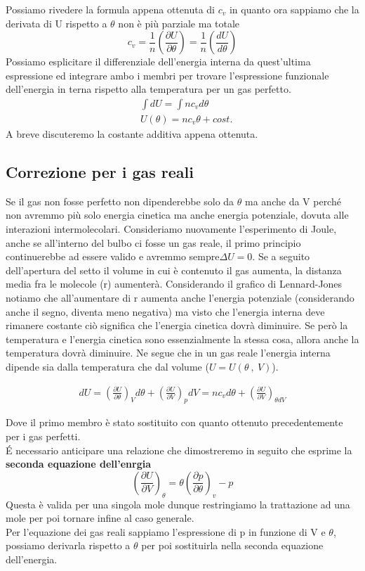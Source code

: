 \documentclass[10pt,a4paper]{article}
\begin{document}
Possiamo rivedere la formula appena ottenuta di \(c_v\) in quanto ora sappiamo che la derivata di U rispetto a $\theta$ non è più parziale ma totale
\[c_v =\frac{1}{n}\left(\frac{\partial U}{\partial\theta}\right)=\frac{1}{n}\left(\frac{dU}{d\theta}\right)\]
Possiamo esplicitare il differenziale dell'energia interna da quest'ultima espressione ed integrare ambo i membri per trovare l'espressione funzionale dell'energia in terna rispetto alla temperatura per un gas perfetto.
\begin{align}\label{eq:U_gas_perfetti}
	&\int dU = \int n c_v d\theta\nonumber\\
	&U(\theta) = n c_v \theta + cost.
\end{align} 
A breve discuteremo la costante additiva appena ottenuta.
\subsection{Correzione per i gas reali}
Se il gas non fosse perfetto non dipenderebbe solo da $\theta$ ma anche da V perché non avremmo più solo energia cinetica ma anche energia potenziale, dovuta alle interazioni intermolecolari. Consideriamo nuovamente l'esperimento di Joule, anche se all'interno del bulbo ci fosse un gas reale, il primo principio continuerebbe ad essere valido e avremmo sempre\(\Delta U = 0\). Se a seguito dell'apertura del setto il volume in cui è contenuto il gas aumenta, la distanza media fra le molecole (r) aumenterà. Considerando il grafico di Lennard-Jones notiamo che all'aumentare di r aumenta anche l'energia potenziale (considerando anche il segno, diventa meno negativa) ma visto che l'energia interna deve rimanere costante ciò significa che l'energia cinetica dovrà diminuire. Se però la temperatura e l'energia cinetica sono essenzialmente la stessa cosa, allora anche la temperatura dovrà diminuire. Ne segue che in un gas reale l'energia interna dipende sia dalla temperatura che dal volume (\(U = U(\theta\ ,\ V)\)). 

\begin{align*} 
	dU = \left(\frac{\partial U}{\partial \theta}\right)_V d\theta + \left(\frac{\partial U}{\partial V}\right)_p dV = n c_v d\theta +\left(\frac{\partial U}{\partial V}\right)_{\theta dV}
\end{align*} 

Dove il primo membro è stato sostituito con quanto ottenuto precedentemente per i gas perfetti.\\
\'{E} necessario anticipare una relazione che dimostreremo in seguito che esprime la \textbf{seconda equazione dell'enrgia}
\[ \left(\frac{\partial U}{\partial V}\right)_{\theta} = \theta \left(\frac{\partial p}{\partial \theta}\right)_v - p \]
Questa è valida per una singola mole dunque restringiamo la trattazione ad una mole per poi tornare infine al caso generale.\\
Per l'equazione dei gas reali sappiamo l'espressione di p in funzione di V e \(\theta\), possiamo derivarla rispetto a $\theta$ per poi sostituirla nella seconda equazione dell'energia. 
\end{document}
